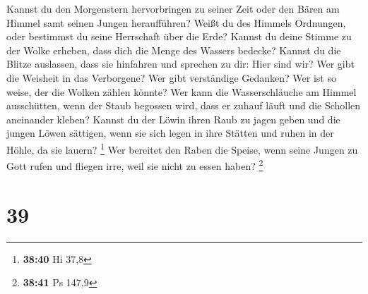  Kannst du den Morgenstern hervorbringen zu seiner Zeit
oder den Bären am Himmel samt seinen Jungen heraufführen? 
Weißt du des Himmels Ordnungen, oder bestimmst du seine Herrschaft über
die Erde?  Kannst du deine Stimme zu der Wolke erheben,
dass dich die Menge des Wassers bedecke?  Kannst du die
Blitze auslassen, dass sie hinfahren und sprechen zu dir: Hier sind wir?
 Wer gibt die Weisheit in das Verborgene? Wer gibt
verständige Gedanken?  Wer ist so weise, der die Wolken
zählen könnte? Wer kann die Wasserschläuche am Himmel ausschütten,
 wenn der Staub begossen wird, dass er zuhauf läuft und die
Schollen aneinander kleben?  Kannst du der Löwin ihren Raub
zu jagen geben und die jungen Löwen sättigen,  wenn sie
sich legen in ihre Stätten und ruhen in der Höhle, da sie lauern?
\footnote{\textbf{38:40} Hi 37,8}  Wer bereitet den Raben
die Speise, wenn seine Jungen zu Gott rufen und fliegen irre, weil sie
nicht zu essen haben? \footnote{\textbf{38:41} Ps 147,9}

\hypertarget{section-9}{%
\section{39}\label{section-9}}

